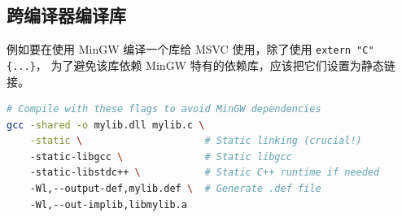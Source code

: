 \subsection{跨编译器编译库}
例如要在使用 MinGW 编译一个库给 MSVC 使用，除了使用 \verb`extern "C" {...}`， 为了避免该库依赖 MinGW 特有的依赖库，应该把它们设置为静态链接。
\begin{lstlisting}[language=bash]
# Compile with these flags to avoid MinGW dependencies
gcc -shared -o mylib.dll mylib.c \
    -static \                     # Static linking (crucial!)
    -static-libgcc \              # Static libgcc
    -static-libstdc++ \           # Static C++ runtime if needed
    -Wl,--output-def,mylib.def \  # Generate .def file
    -Wl,--out-implib,libmylib.a
\end{lstlisting}
